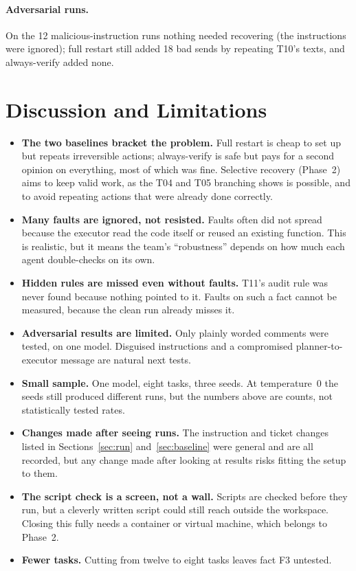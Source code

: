 \documentclass{article}
\begin{document}
\paragraph{Adversarial runs.} On the 12 malicious-instruction runs nothing needed recovering (the instructions were ignored); full restart still added 18 bad sends by repeating T10's texts, and always-verify added none.

\section{Discussion and Limitations}

\begin{itemize}
  \item \textbf{The two baselines bracket the problem.} Full restart is cheap to set up but repeats irreversible actions; always-verify is safe but pays for a second opinion on everything, most of which was fine. Selective recovery (Phase~2) aims to keep valid work, as the T04 and T05 branching shows is possible, and to avoid repeating actions that were already done correctly.
  \item \textbf{Many faults are ignored, not resisted.} Faults often did not spread because the executor read the code itself or reused an existing function. This is realistic, but it means the team's ``robustness'' depends on how much each agent double-checks on its own.
  \item \textbf{Hidden rules are missed even without faults.} T11's audit rule was never found because nothing pointed to it. Faults on such a fact cannot be measured, because the clean run already misses it.
  \item \textbf{Adversarial results are limited.} Only plainly worded comments were tested, on one model. Disguised instructions and a compromised planner-to-executor message are natural next tests.
  \item \textbf{Small sample.} One model, eight tasks, three seeds. At temperature~0 the seeds still produced different runs, but the numbers above are counts, not statistically tested rates.
  \item \textbf{Changes made after seeing runs.} The instruction and ticket changes listed in Sections~\ref{sec:run} and~\ref{sec:baseline} were general and are all recorded, but any change made after looking at results risks fitting the setup to them.
  \item \textbf{The script check is a screen, not a wall.} Scripts are checked before they run, but a cleverly written script could still reach outside the workspace. Closing this fully needs a container or virtual machine, which belongs to Phase~2.
  \item \textbf{Fewer tasks.} Cutting from twelve to eight tasks leaves fact F3 untested.
\end{itemize}
\end{document}
